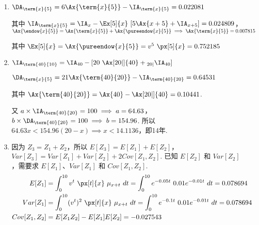 \documentclass[utf8]{ctexart}
\def\lt{<}
\begin{document}
\begin{enumerate}

    \item $\DA_{\term{x}{5}} = 6\Ax{\term{x}{5}} - \IA_{\term{x}{5}} = 0.022081$

    其中 $\IA_{\term{x}{5}} = \IA_{x} - \Ex[5]{x}~[5\Ax{x+5} + \IA_{x+5}] = 0.024809$，$\Ax{\endow{x}{5}} = \Ax{\term{x}{5}} + \Ax{\pureendow{x}{5}}\implies \Ax{\term{x}{5}} = 0.007815$

    其中 $\Ex[5]{x} = \Ax{\pureendow{x}{5}} = v^{5}~\px[5]{x} = 0.752185$

    \item $\IA_{\term{40}{10}} = \IA_{40} - [20~\Ax[20|]{40} + {_{20|}}\IA_{40}]$

    $\DA_{\term{x}{5}} = 21\Ax{\term{40}{20}} - \IA_{\term{40}{20}} = 0.64531$

    其中 $\Ax{\term{40}{20}} = \Ax{40} - \Ax[20|]{40} = 0.10441$.

    又 $a\times\IA_{\term{40}{20}} = 100\implies a = 64.63$，$b\times\DA_{\term{40}{20}} = 100\implies b = 154.96$. 所以 $64.63x\lt 154.96(20-x)\implies x\lt 14.1136$，即14年.

    \item 因为 $Z_{3} = Z_{1} + Z_{2}$，所以 $E[Z_{3}] = E[Z_{1}] + E[Z_{2}]$，$Var[Z_{3}] = Var[Z_{1}] + Var[Z_{2}] + 2Cov[Z_{1},Z_{2}]$. 已知 $E[Z_{2}]$ 和 $Var[Z_{2}]$，需要求 $E[Z_{1}]$、$Var[Z_{1}]$ 和 $Cov[Z_{1},Z_{2}]$.
    \begin{align*}
        E[Z_{1}] & = \int_{0}^{10} v^{t}~\px[t]{x}~\mu_{x+t}~dt = \int_{0}^{10} e^{-0.05t}~0.01e^{-0.01t}~dt = 0.078694\\
        Var[Z_{1}] & = \int_{0}^{10} (v^{t})^{2}~\px[t]{x}~\mu_{x+t}~dt = \int_{0}^{10} e^{-0.1t}~0.01e^{-0.01t}~dt = 0.078694\\
        Cov[Z_{1},Z_{2}] & = E[Z_{1}Z_{2}] - E[Z_{1}]E[Z_{2}] = -0.027543
    \end{align*}


\end{enumerate}
\end{document}
